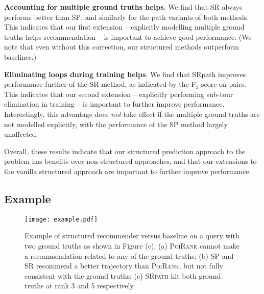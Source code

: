 \textbf{Accounting for multiple ground truths helps}.
We find that \textsc{SR} always performs better than \textsc{SP},
and similarly for the {\sc path} variants of both methods. 
This indicates that our first extension -- explicitly modelling multiple ground truths helps recommendation -- is important to achieve good performance.
(We note that even without this correction, our structured methods outperform baselines.)

\textbf{Eliminating loops during training helps}.
We find that {\sc SRpath} improves performance further of the {\sc SR} method,
as indicated by the F$_1$ score on pairs.
This indicates that our second extension -- explicitly performing sub-tour elimination in training -- is important to further improve performance.
Interestingly,
this advantage does \emph{not} take effect if the multiple ground truths are not modelled explicitly,
with the performance of the {\sc SP} method largely unaffected.

Overall, these results indicate that our structured prediction approach to the problem has
benefits over non-structured approaches,
and that our extensions to the vanilla structured approach are important to further improve performance.


\subsection{Example}
\label{sec:example}

\begin{figure*}[t]
	\centering
	\texttt{[image: example.pdf]}
	\caption{Example of structured recommender versus baseline on a query with two ground truths as shown in Figure (c). 
             (a) \textsc{PoiRank} cannot make a recommendation related to any of the ground truths; 
             (b) \textsc{SP} and \textsc{SR} recommend a better trajectory than \textsc{PoiRank}, but not fully consistent with the ground truths;
             (c) \textsc{SRpath} hit both ground truths at rank 3 and 5 respectively.}
	\label{fig:example}
\end{figure*}


